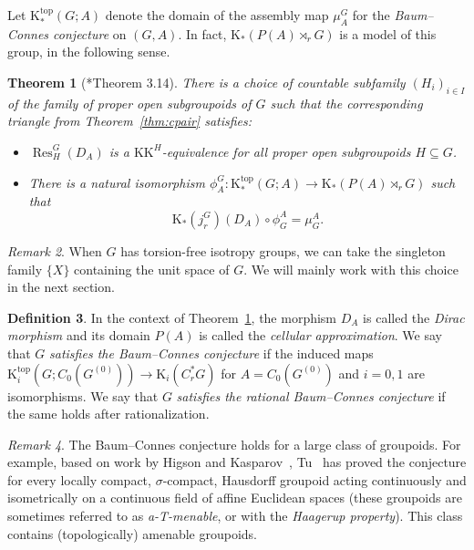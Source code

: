 \documentclass[a4paper,reqno]{amsart}
\theoremstyle{plain}
\newtheorem{theorem}{Theorem}[section]
\theoremstyle{definition}
\newtheorem{definition}[theorem]{Definition}
\theoremstyle{remark}
\newtheorem{remark}[theorem]{Remark}
\numberwithin{equation}{section}
\newcommand{\rK}{\mathrm{K}}
\newcommand{\KK}{\mathrm{KK}}
\DeclareMathOperator{\Res}{Res}
\begin{document}
Let $\rK_*^{\mathrm{top}}(G; A)$ denote the domain of the assembly map $\mu^G_A$ for the \emph{Baum--Connes conjecture} on $(G,A)$.
In fact, $\rK_*(P(A) \rtimes_r G)$ is a model of this group, in the following sense.

\begin{theorem}[\cite{val:kthpgrp}*{Theorem 3.14}]\label{thm:bc}
There is a choice of countable subfamily $(H_i)_{i\in I}$ of the family of proper open subgroupoids of $G$ such that the corresponding triangle from Theorem~\ref{thm:cpair} satisfies:
\begin{itemize}
\item $\Res^G_H(D_A)$ is a $\KK^H$-equivalence for all proper open subgroupoids $H\subseteq G$.
\item There is a natural isomorphism $\phi^G_A\colon \rK_*^{\mathrm{top}}(G; A)\to \rK_*(P(A)\rtimes_r G)$ such that 
\[
\rK_*(j^G_r)(D_A)\circ \phi^A_G=\mu^A_G.
\]
\end{itemize}
\end{theorem}

\begin{remark}\label{rem:indresX}
When $G$ has torsion-free isotropy groups, we can take the singleton family $\{X\}$ containing the unit space of $G$.
We will mainly work with this choice in the next section.
\end{remark}

\begin{definition}%
In the context of Theorem~\ref{thm:bc}, the morphism $D_A$ is called the \emph{Dirac morphism} and its domain $P(A)$ is called the \emph{cellular approximation}.
We say that $G$ \emph{satisfies the Baum--Connes conjecture} if the induced maps $\rK_i^{\mathrm{top}}(G; C_0(G^{(0)})) \to \rK_i(C^*_r G)$ for $A = C_0(G^{(0)})$ and $i = 0, 1$ are isomorphisms.
We say that $G$ \emph{satisfies the rational Baum--Connes conjecture} if the same holds after rationalization.
\end{definition}

\begin{remark}\label{rem:bc-amen}
The Baum--Connes conjecture holds for a large class of groupoids.
For example, based on work by Higson and Kasparov~\cite{higkas:bc}, Tu~\cites{tu:moy} has proved the conjecture for every locally compact, $\sigma$-compact, Hausdorff groupoid acting continuously and isometrically on a continuous field of affine Euclidean spaces (these groupoids are sometimes referred to as \emph{a-T-menable}, or with the \emph{Haagerup property}).
This class contains (topologically) amenable groupoids.
\end{remark}
\end{document}
